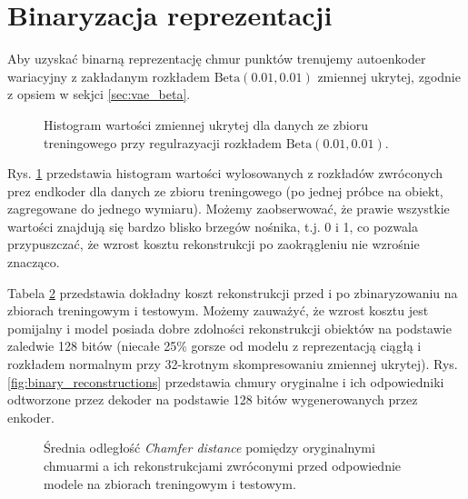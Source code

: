 \documentclass{iithesis}
\begin{document}
\section{Binaryzacja reprezentacji}
Aby uzyskać binarną reprezentację chmur punktów trenujemy autoenkoder wariacyjny
z zakładanym rozkładem $\text{Beta}(0.01, 0.01)$ zmiennej ukrytej,
zgodnie z opsiem w sekjci \ref{sec:vae_beta}.

\begin{figure}[hb!]
    \caption{\label{fig:binary_hist} Histogram wartości zmiennej ukrytej dla danych ze zbioru
    treningowego przy regulrazyacji rozkładem $\text{Beta}(0.01, 0.01)$.}
\end{figure}

Rys. \ref{fig:binary_hist} przedstawia histogram wartości wylosowanych
z rozkładów zwróconych prez endkoder dla danych ze zbioru treningowego
(po jednej próbce na obiekt, zagregowane do jednego wymiaru). Możemy zaobserwować,
że prawie wszystkie wartości znajdują się bardzo blisko brzegów nośnika, t.j. 0 i 1,
co pozwala przypuszczać, że wzrost kosztu rekonstrukcji po zaokrągleniu nie wzrośnie znacząco.

Tabela \ref{fig:increase_after_bin} przedstawia dokładny koszt rekonstrukcji
przed i po zbinaryzowaniu na zbiorach treningowym i testowym. Możemy zauważyć, że wzrost kosztu
jest pomijalny i model posiada dobre zdolności rekonstrukcji obiektów na podstawie zaledwie 128 bitów
(niecałe 25\% gorsze od modelu z reprezentacją ciągłą i rozkładem normalnym przy
32-krotnym skompresowaniu zmiennej ukrytej).
Rys. \ref{fig:binary_reconstructions} przedstawia chmury oryginalne i ich odpowiedniki
odtworzone przez dekoder na podstawie 128 bitów wygenerowanych przez enkoder.

\begin{figure}
    \caption{\label{fig:increase_after_bin} Średnia odległość \textit{Chamfer distance} pomiędzy
    oryginalnymi chmuarmi a ich rekonstrukcjami zwróconymi przed odpowiednie modele na zbiorach
    treningowym i testowym.}
\end{figure}
\end{document}
